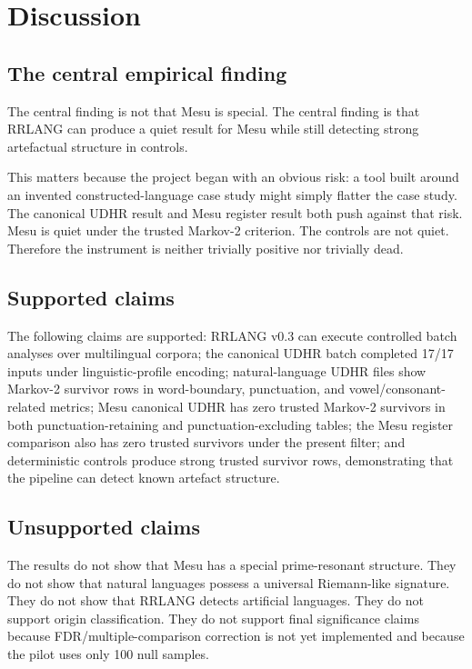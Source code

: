 \documentclass[11pt,a4paper]{article}
\newcommand{\RRLANG}{\textsc{RRLANG}}
\begin{document}
\section{Discussion}
\subsection{The central empirical finding}
The central finding is not that Mesu is special. The central finding is that \RRLANG{} can produce a quiet result for Mesu while still detecting strong artefactual structure in controls.

This matters because the project began with an obvious risk: a tool built around an invented constructed-language case study might simply flatter the case study. The canonical UDHR result and Mesu register result both push against that risk. Mesu is quiet under the trusted Markov-2 criterion. The controls are not quiet. Therefore the instrument is neither trivially positive nor trivially dead.

\subsection{Supported claims}
The following claims are supported: \RRLANG{} v0.3 can execute controlled batch analyses over multilingual corpora; the canonical UDHR batch completed 17/17 inputs under linguistic-profile encoding; natural-language UDHR files show Markov-2 survivor rows in word-boundary, punctuation, and vowel/consonant-related metrics; Mesu canonical UDHR has zero trusted Markov-2 survivors in both punctuation-retaining and punctuation-excluding tables; the Mesu register comparison also has zero trusted survivors under the present filter; and deterministic controls produce strong trusted survivor rows, demonstrating that the pipeline can detect known artefact structure.

\subsection{Unsupported claims}
The results do not show that Mesu has a special prime-resonant structure. They do not show that natural languages possess a universal Riemann-like signature. They do not show that \RRLANG{} detects artificial languages. They do not support origin classification. They do not support final significance claims because FDR/multiple-comparison correction is not yet implemented and because the pilot uses only 100 null samples.
\end{document}
